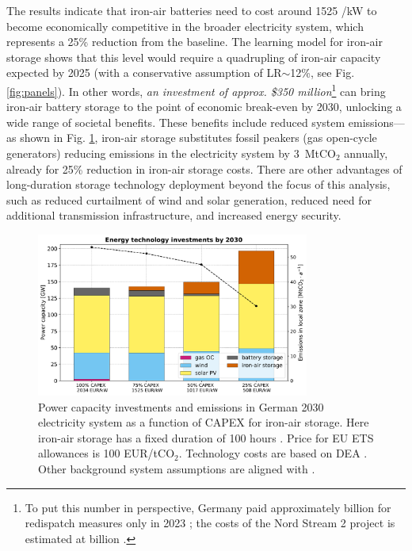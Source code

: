 \documentclass[pdflatex,sn-basic, Numbered]{sn-jnl}%
\theoremstyle{thmstyleone}%
\theoremstyle{thmstyletwo}%
\theoremstyle{thmstylethree}%
\begin{document}
The results indicate that iron-air batteries need to cost around 1525 \officialeuro/kW to become economically competitive in the broader electricity system, which represents a 25\% reduction from the baseline. The learning model for iron-air storage shows that this level would require a quadrupling of iron-air capacity expected by 2025 (with a conservative assumption of LR$\sim$12\%, see Fig. \ref{fig:panels}). In other words, \textit{an investment of approx. \$350 million}\footnote{To put this number in perspective, Germany paid approximately  billion for redispatch measures only in 2023 \cite{titzIdentifyingDriversMitigators2024, bnetzaBundesnetzagenturMonitoringberichte2023}; the  costs of the Nord Stream 2 project is estimated at  billion \cite{cleanenergywireNordStreamSymbol2018}.} can bring iron-air battery storage to the point of economic break-even by 2030, unlocking a wide range of societal benefits. These benefits include reduced system emissions---as shown in Fig. \ref{fig:impact}, iron-air storage substitutes fossil peakers (gas open-cycle generators) reducing emissions in the electricity system by 3~MtCO$_2$ annually, already for 25\% reduction in iron-air storage costs. There are other advantages of long-duration storage technology deployment beyond the focus of this analysis, such as reduced curtailment of wind and solar generation, reduced need for additional transmission infrastructure, and increased energy security.

\begin{figure}[htbp]
    \centering
    \includegraphics[width=0.8\textwidth]{images/dashboard_3.pdf}
    \caption{Power capacity investments and emissions in German 2030 electricity system as a function of CAPEX for iron-air storage. Here iron-air storage has a fixed duration of 100 hours \cite{FormEnergyLatest2024}. Price for EU ETS allowances is 100 EUR/tCO$_2$. Technology costs are based on DEA \cite{DEA-technologydata}. Other background system assumptions are aligned with \citet{riepin-zenodo-systemlevel247}.}\label{fig:impact}
\end{figure}
\end{document}
